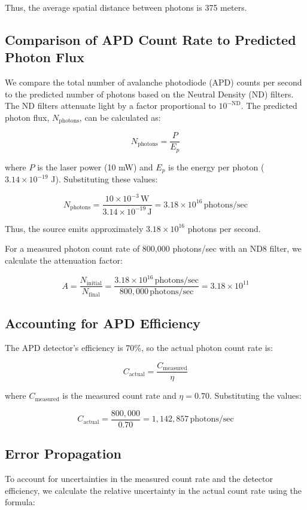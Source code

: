 \documentclass{article}
\numberwithin{equation}{section}
\begin{document}
Thus, the average spatial distance between photons is 375 meters.

\subsection{Comparison of APD Count Rate to Predicted Photon Flux}

We compare the total number of avalanche photodiode (APD) counts per second to the predicted number of photons based on the Neutral Density (ND) filters. The ND filters attenuate light by a factor proportional to $10^{-\text{ND}}$. The predicted photon flux, $N_{\text{photons}}$, can be calculated as:

\[
N_{\text{photons}} = \frac{P}{E_p}
\]

where $P$ is the laser power (10 mW) and $E_p$ is the energy per photon ($3.14 \times 10^{-19}$ J). Substituting these values:

\[
N_{\text{photons}} = \frac{10 \times 10^{-3} \, \text{W}}{3.14 \times 10^{-19} \, \text{J}} = 3.18 \times 10^{16} \, \text{photons/sec}
\]

Thus, the source emits approximately $3.18 \times 10^{16}$ photons per second.

For a measured photon count rate of 800,000 photons/sec with an ND8 filter, we calculate the attenuation factor:

\[
A = \frac{N_{\text{initial}}}{N_{\text{final}}} = \frac{3.18 \times 10^{16} \, \text{photons/sec}}{800,000 \, \text{photons/sec}} = 3.18 \times 10^{11}
\]

\subsection{Accounting for APD Efficiency}

The APD detector's efficiency is 70\%, so the actual photon count rate is:

\[
C_{\text{actual}} = \frac{C_{\text{measured}}}{\eta}
\]

where $C_{\text{measured}}$ is the measured count rate and $\eta = 0.70$. Substituting the values:

\[
C_{\text{actual}} = \frac{800,000}{0.70} = 1,142,857 \, \text{photons/sec}
\]

\subsection{Error Propagation}

To account for uncertainties in the measured count rate and the detector efficiency, we calculate the relative uncertainty in the actual count rate using the formula:
\end{document}
